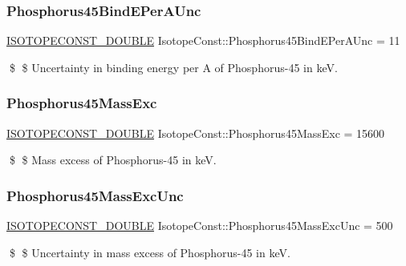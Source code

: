 \subsubsection{\texorpdfstring{Phosphorus45\+Bind\+E\+Per\+A\+Unc}{Phosphorus45BindEPerAUnc}}
{\footnotesize\ttfamily \mbox{\hyperlink{group___isotope_const-_macros_ga8f45a7272ce02c0b4c65c44636ed719a}{I\+S\+O\+T\+O\+P\+E\+C\+O\+N\+S\+T\+\_\+\+D\+O\+U\+B\+LE}} Isotope\+Const\+::\+Phosphorus45\+Bind\+E\+Per\+A\+Unc = 11}

\$ \$ Uncertainty in binding energy per A of Phosphorus-\/45 in keV. \mbox{\label{group___isotope_const-_phosphorus-_p45_ga1be051c39c9fe359ad1b371ecaeff3f4}} 
\subsubsection{\texorpdfstring{Phosphorus45\+Mass\+Exc}{Phosphorus45MassExc}}
{\footnotesize\ttfamily \mbox{\hyperlink{group___isotope_const-_macros_ga8f45a7272ce02c0b4c65c44636ed719a}{I\+S\+O\+T\+O\+P\+E\+C\+O\+N\+S\+T\+\_\+\+D\+O\+U\+B\+LE}} Isotope\+Const\+::\+Phosphorus45\+Mass\+Exc = 15600}

\$ \$ Mass excess of Phosphorus-\/45 in keV. \mbox{\label{group___isotope_const-_phosphorus-_p45_ga407e91ed0b8848f6bc2aab3f0b5ebe42}} 
\subsubsection{\texorpdfstring{Phosphorus45\+Mass\+Exc\+Unc}{Phosphorus45MassExcUnc}}
{\footnotesize\ttfamily \mbox{\hyperlink{group___isotope_const-_macros_ga8f45a7272ce02c0b4c65c44636ed719a}{I\+S\+O\+T\+O\+P\+E\+C\+O\+N\+S\+T\+\_\+\+D\+O\+U\+B\+LE}} Isotope\+Const\+::\+Phosphorus45\+Mass\+Exc\+Unc = 500}

\$ \$ Uncertainty in mass excess of Phosphorus-\/45 in keV. \mbox{\label{group___isotope_const-_phosphorus-_p45_ga0aba2722c31724c62fcc38f383752d89}} 
